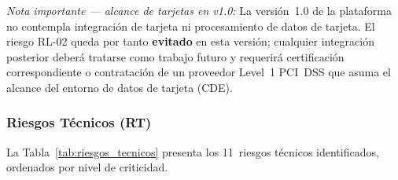 \noindent\textit{Nota importante --- alcance de tarjetas en v1.0:} La versión~1.0 de la
plataforma no contempla integración de tarjeta ni procesamiento de datos de tarjeta.
El riesgo RL-02 queda por tanto \textbf{evitado} en esta versión; cualquier integración
posterior deberá tratarse como trabajo futuro y requerirá certificación correspondiente
o contratación de un proveedor Level~1 PCI~DSS que asuma el alcance del entorno de datos
de tarjeta (CDE).

\subsubsection{Riesgos Técnicos (RT)}

La Tabla~\ref{tab:riesgos_tecnicos} presenta los 11~riesgos t\'ecnicos identificados,
ordenados por nivel de criticidad.

